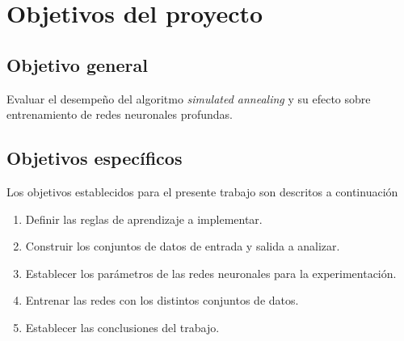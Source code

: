 \section{Objetivos del proyecto}
\begin{comment}
En esta sección se presenta el objetivo general y los objetivos específicos de la presente propuesta.
\end{comment}

\subsection{Objetivo general}
Evaluar el desempeño del algoritmo {\em simulated annealing} y su efecto sobre entrenamiento de redes neuronales profundas.


\subsection{Objetivos específicos}
Los objetivos establecidos para el presente trabajo son descritos a continuación
\begin{enumerate}
    \item Definir las reglas de aprendizaje a implementar.
    \item Construir los conjuntos de datos de entrada y salida a analizar.
	\item Establecer los parámetros de las redes neuronales para la experimentación.
	\item Entrenar las redes con los distintos conjuntos de datos.
    \item Establecer las conclusiones del trabajo.
\end{enumerate}
